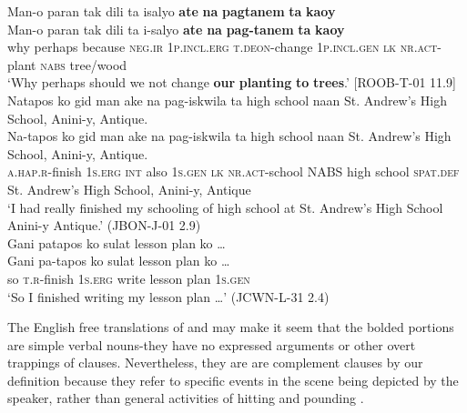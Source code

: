 \ea
Man-o  paran  tak  dili  ta  isalyo \textbf{ate}  \textbf{na}  \textbf{pagtanem}  \textbf{ta}  \textbf{kaoy}  \smallskip\\
\gll Man-o  paran  tak  dili  ta  i-salyo \textbf{ate}  \textbf{na}  \textbf{pag-tanem}  \textbf{ta}  \textbf{kaoy}  \\
why  perhaps  because  \textsc{neg.ir}  1\textsc{p.incl.erg}  \textsc{t.deon}-change
1\textsc{p.incl.gen}  \textsc{lk}  \textsc{nr.act}-plant  \textsc{nabs}  tree/wood \\
\glt ‘Why perhaps should we not change \textbf{our} \textbf{planting} \textbf{to} \textbf{trees}.’ [ROOB-T-01 11.9]
\z
\ea
Natapos ko gid man ake na pag-iskwila ta high school naan St. Andrew's High School, Anini-y, Antique. \\
\gll Na-tapos	ko	gid	man	ake	na	pag-iskwila	ta	high school naan	St. Andrew's High School,	Anini-y,	Antique. \\
\textsc{a.hap.r}-finish	1\textsc{s.erg}	\textsc{int}	also	1\textsc{s.gen}	\textsc{lk}	\textsc{nr.act}-school	NABS	high school \textsc{spat.def}	St. Andrew's High School,	Anini-y,	Antique\\
\glt ‘I had really finished my schooling of high school at St. Andrew’s High School Anini-y Antique.’ (JBON-J-01 2.9)\\
\gll Gani patapos ko sulat lesson plan ko …\\
Gani	pa-tapos	ko	sulat	lesson plan	ko …\\
so	\textsc{t.r}-finish	1\textsc{s.erg}	write	lesson plan	1\textsc{s.gen}\\
\glt ‘So I finished writing my lesson plan …’ (JCWN-L-31 2.4)
\z

The English free translations of  and  may make it seem that the bolded portions are simple verbal nouns-they have no expressed arguments or other overt trappings of clauses. Nevertheless, they are are complement clauses by our definition because they refer to specific events in the scene being depicted by the speaker, rather than general activities of hitting  and pounding .

